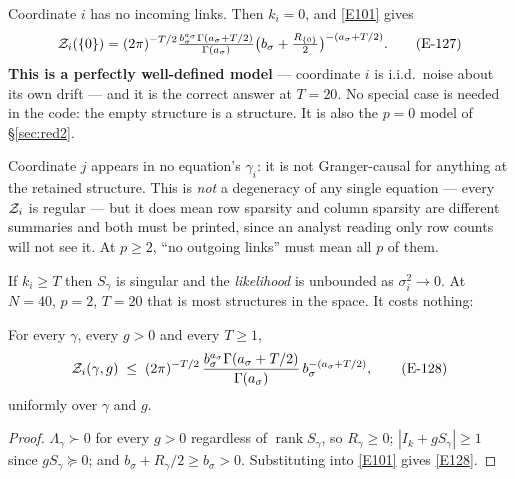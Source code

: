 \begin{description}[style=nextline, leftmargin=2em, topsep=0pt]
\item[(D-a) An all-zero row, $\gamma_i=\{0\}$.]
  Coordinate $i$ has no incoming links. Then $k_i=0$, and \eqref{E101} gives
\begin{equation}
\mathcal{Z}_i(\{0\}) = (2\pi)^{-T/2}\tfrac{b_\sigma^{a_\sigma}\Gamma(a_\sigma+T/2)}{\Gamma(a_\sigma)}
\bigl(b_\sigma+\tfrac{R_{\{0\}}}{2}\bigr)^{-(a_\sigma+T/2)}.
\tag{E-127}\label{E127}
\end{equation}
  \textbf{This is a perfectly well-defined model} --- coordinate $i$ is i.i.d.\ noise
  about its own drift --- and it is the correct answer at $T=20$. No special case is
  needed in the code: the empty structure is a structure. It is also the $p=0$ model
  of \S\ref{sec:red2}.

\item[(D-b) An all-zero column.]
  Coordinate $j$ appears in no equation's $\gamma_i$: it is not Granger-causal for
  anything at the retained structure. This is \emph{not} a degeneracy of any single
  equation --- every $\mathcal{Z}_i$ is regular --- but it does mean row sparsity and column
  sparsity are different summaries and both must be printed, since an analyst reading
  only row counts will not see it. At $p\ge2$, ``no outgoing links'' must mean all
  $p$ of them.

\item[(D-c) $T$ small relative to $k$.]
  If $k_i\ge T$ then $S_\gamma$ is singular and the \emph{likelihood} is unbounded as
  $\sigma_i^2\to0$. At $N=40$, $p=2$, $T=20$ that is most structures in the space. It
  costs nothing:

  \begin{proposition}\label{prop:finite}
  For every $\gamma$, every $g>0$ and every $T\ge1$,
  \begin{equation}
  \mathcal{Z}_i(\gamma,g) \;\le\; (2\pi)^{-T/2}\,
  \frac{b_\sigma^{a_\sigma}\Gamma(a_\sigma+T/2)}{\Gamma(a_\sigma)}\,
  b_\sigma^{-(a_\sigma+T/2)},
  \tag{E-128}\label{E128}
  \end{equation}
  uniformly over $\gamma$ and $g$.
  \end{proposition}

  \begin{proof}
  $\Lambda_\gamma\succ0$ for every $g>0$ regardless of $\operatorname{rank}S_\gamma$,
  so $R_\gamma\ge0$; $|I_k+gS_\gamma|\ge1$ since $gS_\gamma\succeq0$; and
  $b_\sigma+R_\gamma/2\ge b_\sigma>0$. Substituting into \eqref{E101} gives
  \eqref{E128}.
  \end{proof}


\end{description}
